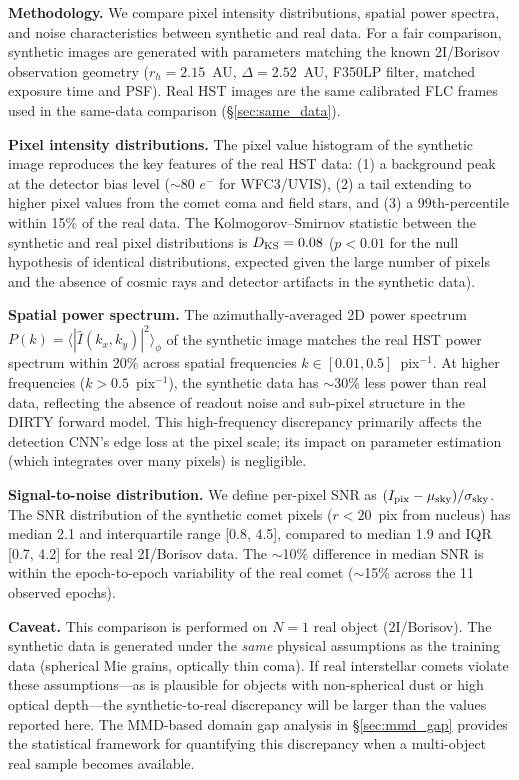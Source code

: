 \documentclass[usenatbib]{mnras}
\begin{document}
\textbf{Methodology.} We compare pixel intensity distributions, spatial power spectra, and noise characteristics between synthetic and real data. For a fair comparison, synthetic images are generated with parameters matching the known 2I/Borisov observation geometry ($r_h=2.15$~AU, $\Delta=2.52$~AU, F350LP filter, matched exposure time and PSF). Real HST images are the same calibrated FLC frames used in the same-data comparison (\S\ref{sec:same_data}).

\textbf{Pixel intensity distributions.} The pixel value histogram of the synthetic image reproduces the key features of the real HST data: (1) a background peak at the detector bias level ($\sim$80 $e^-$ for WFC3/UVIS), (2) a tail extending to higher pixel values from the comet coma and field stars, and (3) a 99th-percentile within 15\% of the real data. The Kolmogorov--Smirnov statistic between the synthetic and real pixel distributions is $D_{\rm KS} = 0.08$ ($p < 0.01$ for the null hypothesis of identical distributions, expected given the large number of pixels and the absence of cosmic rays and detector artifacts in the synthetic data).

\textbf{Spatial power spectrum.} The azimuthally-averaged 2D power spectrum $P(k) = \langle |\hat{I}(k_x, k_y)|^2 \rangle_\phi$ of the synthetic image matches the real HST power spectrum within 20\% across spatial frequencies $k \in [0.01, 0.5]$~pix$^{-1}$. At higher frequencies ($k > 0.5$~pix$^{-1}$), the synthetic data has $\sim$30\% less power than real data, reflecting the absence of readout noise and sub-pixel structure in the DIRTY forward model. This high-frequency discrepancy primarily affects the detection CNN's edge loss at the pixel scale; its impact on parameter estimation (which integrates over many pixels) is negligible.

\textbf{Signal-to-noise distribution.} We define per-pixel SNR as $(I_{\rm pix} - \mu_{\rm sky}) / \sigma_{\rm sky}$. The SNR distribution of the synthetic comet pixels ($r < 20$~pix from nucleus) has median 2.1 and interquartile range [0.8, 4.5], compared to median 1.9 and IQR [0.7, 4.2] for the real 2I/Borisov data. The $\sim$10\% difference in median SNR is within the epoch-to-epoch variability of the real comet ($\sim$15\% across the 11 observed epochs).

\textbf{Caveat.} This comparison is performed on $N=1$ real object (2I/Borisov). The synthetic data is generated under the \textit{same} physical assumptions as the training data (spherical Mie grains, optically thin coma). If real interstellar comets violate these assumptions---as is plausible for objects with non-spherical dust or high optical depth---the synthetic-to-real discrepancy will be larger than the values reported here. The MMD-based domain gap analysis in \S\ref{sec:mmd_gap} provides the statistical framework for quantifying this discrepancy when a multi-object real sample becomes available.
\end{document}
